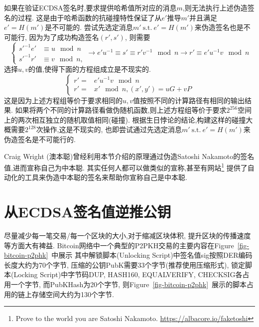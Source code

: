 \documentclass{article}
\begin{document}
如果在验证ECDSA签名时,要求提供哈希值所对应的消息$m$,则无法执行上述伪造签名的过程.
这是由于哈希函数的抗碰撞特性保证了从$e'$推导$m'$并且满足$e'=H(m')$是不可能的.
尝试先选定消息$m'\ \text{s.t.}\ e' = H(m')$来伪造签名也是不可能行, 因为为了成功构造签名$(r', s')$, 则需要
\begin{equation}\nonumber
\left\{
\begin{array}{ll}
s'^{-1}e' & \equiv u \mod n\\
s'^{-1}r' & \equiv v \mod n,
\end{array}
\right.
\rightarrow
e'u^{-1} \equiv s' \equiv r'v^{-1} \mod n
\rightarrow
r' \equiv e'u^{-1}v \mod n
\end{equation}
选择$u,v$的值,使得下面的方程组成立是不现实的.
\begin{equation}\nonumber
\left\{
\begin{array}{ll}
r' = & e'u^{-1}v \mod n\\
r ' = & x' \mod n,  (x', y') = uG + vP
\end{array}
\right.
\end{equation}
这是因为上述方程组等价于要求相同的$u,v$值按照不同的计算路径有相同的输出结果.
如果将两个不同的计算路径看做伪随机函数,则上述方程组等价于要求$2^{256}$空间上的两次相互独立的随机取值相同(碰撞).
根据生日悖论的结论,构建这样的碰撞大概需要$2^{128}$次操作,这是不现实的,
也即尝试通过先选定消息$m'\ \text{s.t.}\ e' = H(m')$来伪造签名是不可能行的.

Craig Wright (澳本聪)曾经利用本节介绍的原理通过伪造Satoshi Nakamoto的签名值,进而宣称自己为中本聪.
其实任何人都可以做类似的宣称,甚至有网站\footnote{
Prove to the world you are Satoshi Nakamoto. \url{https://albacore.io/faketoshi}}
提供了自动化的工具来伪造中本聪的签名来帮助你宣称自己是中本聪.

\section{从ECDSA签名值逆推公钥}

尽量减少每一笔交易/每一个区块的大小,对于缩减区块体积, 提升区块的传播速度等方面大有裨益.
Bitcoin网络中一个典型的P2PKH交易的主要内容在Figure~\ref{fig-bitcoin-p2phk}~中展示
其中解锁脚本(Unlocking Script)中签名值\textsf{sig}按照DER编码长度大约为70个字节, 
压缩的公钥\textsf{PubK}需要33个字节(推荐使用压缩形式),
锁定脚本(Locking Script)中字节码\textsf{DUP}, \textsf{HASH160}, \textsf{EQUALVERIFY}, \textsf{CHECKSIG}各占用一个字节, 
而\textsf{PubKHash}为20个字节, 则Figure~\ref{fig-bitcoin-p2phk}~展示的脚本占用的链上存储空间大约为130个字节.
\end{document}
